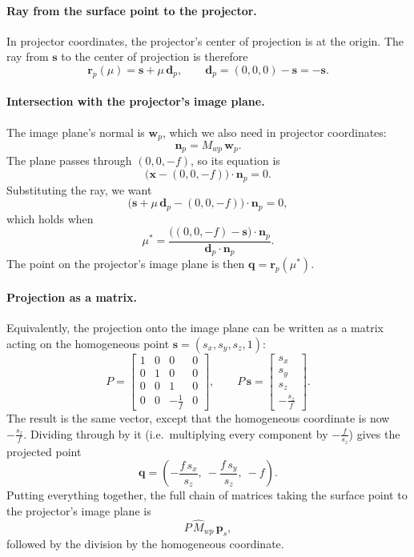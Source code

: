 \documentclass[11pt]{article}
\newcommand{\vect}[1]{\mathbf{#1}}
\begin{document}
\paragraph{Ray from the surface point to the projector.}
In projector coordinates, the projector's center of projection is at the origin. The ray
from $\vect{s}$ to the center of projection is therefore
\[
  \vect{r}_p(\mu) = \vect{s} + \mu\, \vect{d}_p, \qquad
  \vect{d}_p = (0, 0, 0) - \vect{s} = -\vect{s}.
\]

\paragraph{Intersection with the projector's image plane.}
The image plane's normal is $\vect{w}_p$, which we also need in projector coordinates:
\[
  \vect{n}_p = M_{wp}\, \vect{w}_p.
\]
The plane passes through $(0, 0, -f)$, so its equation is
\[
  \bigl(\vect{x} - (0, 0, -f)\bigr) \cdot \vect{n}_p = 0.
\]
Substituting the ray, we want
\[
  \bigl(\vect{s} + \mu\, \vect{d}_p - (0, 0, -f)\bigr) \cdot \vect{n}_p = 0,
\]
which holds when
\[
  \mu^* = \frac{\bigl((0, 0, -f) - \vect{s}\bigr) \cdot \vect{n}_p}{\vect{d}_p \cdot \vect{n}_p}.
\]
The point on the projector's image plane is then $\vect{q} = \vect{r}_p(\mu^*)$.

\paragraph{Projection as a matrix.}
Equivalently, the projection onto the image plane can be written as a matrix acting on
the homogeneous point $\vect{s} = (s_x, s_y, s_z, 1)$:
\[
  P =
  \begin{bmatrix}
    1 & 0 & 0 & 0 \\
    0 & 1 & 0 & 0 \\
    0 & 0 & 1 & 0 \\
    0 & 0 & -\frac{1}{f} & 0
  \end{bmatrix},
  \qquad
  P\,\vect{s} =
  \begin{bmatrix} s_x \\ s_y \\ s_z \\ -\frac{s_z}{f} \end{bmatrix}.
\]
The result is the same vector, except that the homogeneous coordinate is now
$-\frac{s_z}{f}$. Dividing through by it (i.e.\ multiplying every component by
$-\frac{f}{s_z}$) gives the projected point
\[
  \vect{q} = \left( -\frac{f\, s_x}{s_z},\ -\frac{f\, s_y}{s_z},\ -f \right).
\]
Putting everything together, the full chain of matrices taking the surface point to the
projector's image plane is
\[
  P\, \hat{M}_{wp}\, \vect{p}_s,
\]
followed by the division by the homogeneous coordinate.
\end{document}
